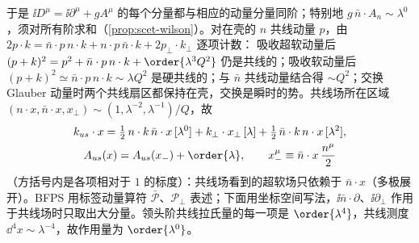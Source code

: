 于是 $\ii D^\mu=\ii\partial^\mu+gA^\mu$ 的每个分量都与相应的动量分量同阶；特别地 $g\,\bar n\cdot A_n\sim\lambda^0$，须对所有阶求和（\cref{prop:scet-wilson}）。对在壳的 $n$ 共线动量 $p$，由 $2p\cdot k=\bar n\cdot p\,n\cdot k+n\cdot p\,\bar n\cdot k+2p_\perp\cdot k_\perp$ 逐项计数：%
吸收超软动量后 $(p+k)^2=p^2+\bar n\cdot p\,n\cdot k+\order{\lambda^3Q^2}$ 仍是共线的；吸收软动量后 $(p+k)^2\simeq\bar n\cdot p\,n\cdot k\sim\lambda Q^2$ 是硬共线的；与 $\bar n$ 共线动量结合得 $\sim Q^2$；交换 Glauber 动量时两个共线扇区都保持在壳，交换是瞬时的势。共线场所在区域 $(n\cdot x,\bar n\cdot x,x_\perp)\sim(1,\lambda^{-2},\lambda^{-1})/Q$，故
\begin{equation}\label{eq:scet-multipole}
\begin{gathered}
k_{us}\cdot x=\tfrac12\,n\cdot k\,\bar n\cdot x\,[\lambda^0]+k_\perp\cdot x_\perp\,[\lambda]+\tfrac12\,\bar n\cdot k\,n\cdot x\,[\lambda^2],\\
A_{us}(x)=A_{us}(x_-)+\order{\lambda},\qquad x_-^\mu\equiv\bar n\cdot x\,\frac{n^\mu}{2}
\end{gathered}
\end{equation}
（方括号内是各项相对于 $1$ 的标度）：共线场看到的超软场只依赖于 $\bar n\cdot x$（多极展开）。BFPS 用标签动量算符 $\bar{\mathcal P}$、$\mathcal P_\perp$ 表述\cite{BauerEtAl2001,BauerStewart2001}；下面用坐标空间写法\cite{BenekeEtAl2002,Beneke:2002ni}，$\ii\bar n\cdot\partial$、$\ii\partial_\perp$ 作用于共线场时只取出大分量。领头阶共线拉氏量的每一项是 $\order{\lambda^4}$，共线测度 $\dd^4x\sim\lambda^{-4}$，故作用量为 $\order{\lambda^0}$。

